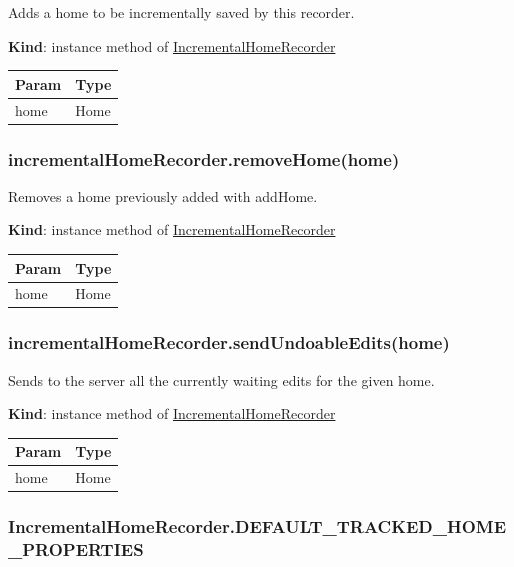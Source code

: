 \documentclass[a4paper]{report}
\begin{document}
Adds a home to be incrementally saved by this recorder.

\textbf{Kind}: instance method of
\protect\hyperlink{IncrementalHomeRecorder}{IncrementalHomeRecorder}

\begin{longtable}[]{@{}ll@{}}
\toprule
Param & Type\tabularnewline
\midrule
\endhead
home & Home\tabularnewline
\bottomrule
\end{longtable}

\hypertarget{incrementalhomerecorder.removehomehome}{%
\subsubsection{incrementalHomeRecorder.removeHome(home)}\label{incrementalhomerecorder.removehomehome}}

Removes a home previously added with addHome.

\textbf{Kind}: instance method of
\protect\hyperlink{IncrementalHomeRecorder}{IncrementalHomeRecorder}

\begin{longtable}[]{@{}ll@{}}
\toprule
Param & Type\tabularnewline
\midrule
\endhead
home & Home\tabularnewline
\bottomrule
\end{longtable}

\hypertarget{incrementalhomerecorder.sendundoableeditshome}{%
\subsubsection{incrementalHomeRecorder.sendUndoableEdits(home)}\label{incrementalhomerecorder.sendundoableeditshome}}

Sends to the server all the currently waiting edits for the given home.

\textbf{Kind}: instance method of
\protect\hyperlink{IncrementalHomeRecorder}{IncrementalHomeRecorder}

\begin{longtable}[]{@{}ll@{}}
\toprule
Param & Type\tabularnewline
\midrule
\endhead
home & Home\tabularnewline
\bottomrule
\end{longtable}

\hypertarget{incrementalhomerecorder.default_tracked_home_properties}{%
\subsubsection{IncrementalHomeRecorder.DEFAULT\_TRACKED\_HOME\_PROPERTIES}\label{incrementalhomerecorder.default_tracked_home_properties}}
\end{document}
